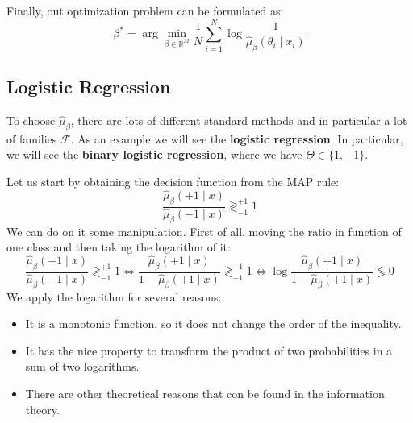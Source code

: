 
Finally, out optimization problem can be formulated as:
\[
    \beta^\ast = \arg\min_{\beta \in \mathbb{R}^M} \frac{1}{N} \sum_{i=1}^{N} \log \frac{1}{\hat{\mu}_\beta(\theta_i \mid x_i)}
\]

\subsection*{Logistic Regression}
To choose $\hat{\mu}_\beta$, there are lots of different standard methods and in particular a lot of families $\mathcal F$. As an example we will see the \textbf{logistic regression}. In particular, we will see the \textbf{binary logistic regression}, where we have $\Theta \in \{1,-1\}$.

Let us start by obtaining the decision function from the MAP rule:
\[
    \frac{\hat{\mu}_\beta(+1\mid x)}{\hat{\mu}_\beta(-1\mid x)} \gtrless^{+1}_{-1} 1 
\]
We can do on it some manipulation. First of all, moving the ratio in function of one class and then taking the logarithm of it:
\[
    \frac{\hat{\mu}_\beta(+1\mid x)}{\hat{\mu}_\beta(-1\mid x)} \gtrless^{+1}_{-1} 1  \Leftrightarrow \frac{\hat{\mu}_\beta(+1\mid x)}{1 - \hat{\mu}_\beta(+1\mid x)}  \gtrless^{+1}_{-1} 1 \Leftrightarrow \log \frac{\hat{\mu}_\beta(+1\mid x)}{1 - \hat{\mu}_\beta(+1\mid x)} \lessgtr 0
\]
We apply the logarithm for several reasons:
\begin{itemize}
    \item It is a monotonic function, so it does not change the order of the inequality.
    \item It has the nice property to transform the product of two probabilities in a sum of two logarithms.
    \item There are other theoretical reasons that con be found in the information theory.
\end{itemize}

